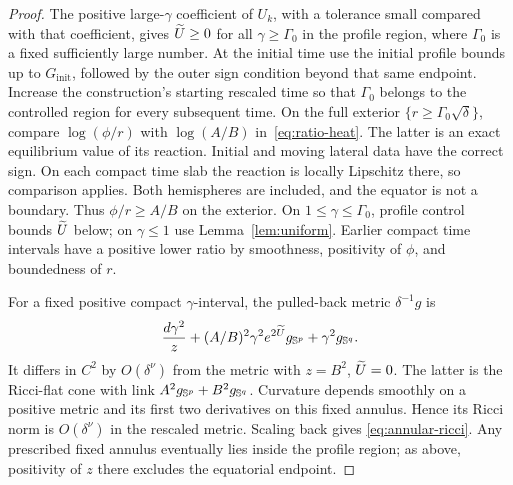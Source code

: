 \begin{proof}
The positive large-\(\gamma\) coefficient of \(U_k\), with a tolerance
small compared with that coefficient, gives \(\widetilde U\ge0\) for all
\(\gamma\ge\Gamma_0\) in the profile region, where \(\Gamma_0\) is a
fixed sufficiently large number. At the initial time use the initial
profile bounds up to \(G_{\mathrm{init}}\), followed by the outer sign
condition beyond that same endpoint. Increase the construction's
starting rescaled time so that \(\Gamma_0\) belongs to the controlled
region for every subsequent time. On the full exterior
\(\{r\ge\Gamma_0\sqrt\delta\}\), compare \(\log(\phi/r)\) with
\(\log(A/B)\) in~\eqref{eq:ratio-heat}. The latter is an exact equilibrium
value of its reaction. Initial and moving lateral data have the correct
sign. On each compact time slab the reaction is locally Lipschitz there,
so comparison applies. Both hemispheres are included, and the equator is
not a boundary. Thus \(\phi/r\ge A/B\) on the exterior.
On \(1\le\gamma\le\Gamma_0\), profile control bounds \(\widetilde U\) below;
on \(\gamma\le1\) use Lemma~\ref{lem:uniform}.
Earlier compact time intervals have a positive lower ratio by smoothness,
positivity of \(\phi\), and boundedness of \(r\).

For a fixed positive compact \(\gamma\)-interval, the pulled-back metric
\(\delta^{-1}g\) is
\[
\frac{d\gamma^2}{z}+(A/B)^2\gamma^2e^{2\widetilde U}g_{\mathbb S^p}
+\gamma^2g_{\mathbb S^q}.
\]
It differs in \(C^2\) by \(O(\delta^\nu)\) from the metric with
\(z=B^2\), \(\widetilde U=0\). The latter is the Ricci-flat cone with link
\(A^2g_{\mathbb S^p}+B^2g_{\mathbb S^q}\). Curvature depends smoothly on a positive
metric and its first two derivatives on this fixed annulus. Hence its
Ricci norm is \(O(\delta^\nu)\) in the rescaled metric. Scaling back gives
\eqref{eq:annular-ricci}.
Any prescribed fixed annulus eventually lies inside the profile region;
as above, positivity of \(z\) there excludes the equatorial endpoint.
\end{proof}
